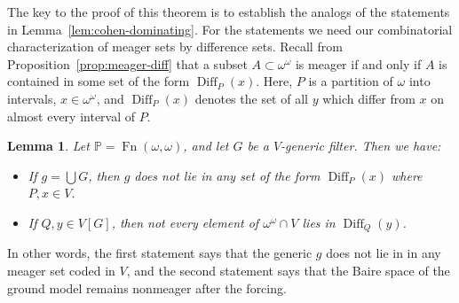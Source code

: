 \documentclass[11pt,oneside]{amsbook}
\newcommand{\PP}{\mathbb P}
\DeclareMathOperator{\Diff}{Diff}
\DeclareMathOperator{\Fn}{Fn}
\theoremstyle{definition}
\theoremstyle{plain}
\newtheorem{lemma}[theorem]{Lemma}
\theoremstyle{definition}
\theoremstyle{remark}
\numberwithin{equation}{section}
\numberwithin{figure}{section}
\begin{document}
The key to the proof of this theorem is to establish the analogs of the statements in Lemma~\ref{lem:cohen-dominating}. For the statements we need our combinatorial characterization of meager sets by difference sets. Recall from Proposition~\ref{prop:meager-diff} that a subset $A\subset\omega^\omega$ is meager if and only if $A$ is contained in some set of the form $\Diff_P(x)$. Here, $P$ is a partition of $\omega$ into intervals, $x\in\omega^\omega$, and $\Diff_P(x)$ denotes the set of all $y$ which differ from $x$ on almost every interval of $P$.

\begin{lemma}
  \label{lem:cohen-meager}
  Let $\PP=\Fn(\omega,\omega)$, and let $G$ be a $V$-generic filter. Then we have:
  \begin{itemize}
  \item If $g=\bigcup G$, then $g$ does not lie in any set of the form $\Diff_P(x)$ where $P,x\in V$.
  \item If $Q,y\in V[G]$, then not every element of $\omega^\omega\cap V$ lies in $\Diff_Q(y)$.
  \end{itemize}
\end{lemma}

In other words, the first statement says that the generic $g$ does not lie in in any meager set coded in $V$, and the second statement says that the Baire space of the ground model remains nonmeager after the forcing.
\end{document}
